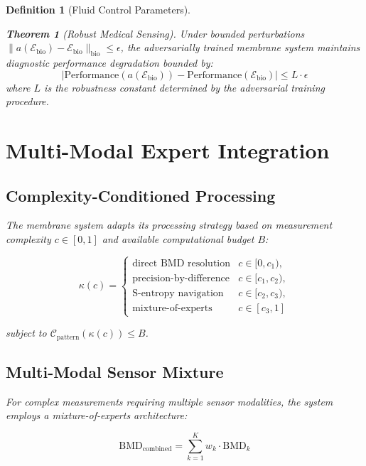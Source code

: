 \documentclass[12pt,a4paper]{article}
\newtheorem{theorem}{Theorem}
\newtheorem{definition}{Definition}
\begin{document}
\begin{definition}[Fluid Control Parameters]
\begin{theorem}[Robust Medical Sensing]
Under bounded perturbations $\|a(\mathcal{E}_{\text{bio}}) - \mathcal{E}_{\text{bio}}\|_{\text{bio}} \leq \epsilon$, the adversarially trained membrane system maintains diagnostic performance degradation bounded by:
\begin{equation}
|\text{Performance}(a(\mathcal{E}_{\text{bio}})) - \text{Performance}(\mathcal{E}_{\text{bio}})| \leq L \cdot \epsilon
\end{equation}
where $L$ is the robustness constant determined by the adversarial training procedure.
\end{theorem}

\section{Multi-Modal Expert Integration}

\subsection{Complexity-Conditioned Processing}

The membrane system adapts its processing strategy based on measurement complexity $c \in [0,1]$ and available computational budget $B$:

\begin{equation}
\kappa(c) = \begin{cases}
\text{direct BMD resolution} & c \in [0, c_1), \\
\text{precision-by-difference} & c \in [c_1, c_2), \\
\text{S-entropy navigation} & c \in [c_2, c_3), \\
\text{mixture-of-experts} & c \in [c_3, 1]
\end{cases}
\end{equation}

subject to $\mathcal{C}_{\text{pattern}}(\kappa(c)) \leq B$.

\subsection{Multi-Modal Sensor Mixture}

For complex measurements requiring multiple sensor modalities, the system employs a mixture-of-experts architecture:

\begin{equation}
\text{BMD}_{\text{combined}} = \sum_{k=1}^{K} w_k \cdot \text{BMD}_k
\end{equation}


\end{definition}
\end{document}
